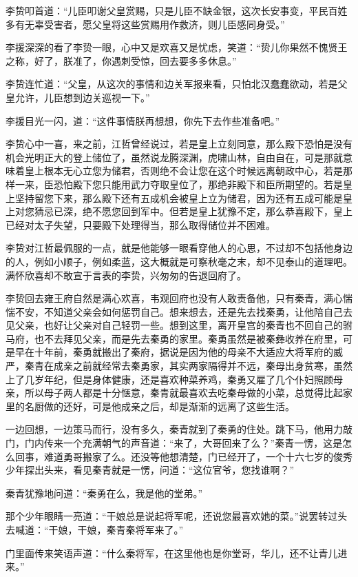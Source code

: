 李贽叩首道：“儿臣叩谢父皇赏赐，只是儿臣不缺金银，这次长安事变，平民百姓多有无辜受害者，愿父皇将这些赏赐用作救济，则儿臣感同身受。”

李援深深的看了李贽一眼，心中又是欢喜又是忧虑，笑道：“贽儿你果然不愧贤王之称，好了，朕准了，你遇刺受惊，回去要多多休息。”

李贽连忙道：“父皇，从这次的事情和边关军报来看，只怕北汉蠢蠢欲动，若是父皇允许，儿臣想到边关巡视一下。”

李援目光一闪，道：“这件事情朕再想想，你先下去作些准备吧。”

李贽心中一喜，来之前，江哲曾经说过，若是皇上立刻同意，那么殿下恐怕是没有机会光明正大的登上储位了，虽然说龙腾深渊，虎啸山林，自由自在，可是那就意味着皇上根本无心立您为储君，否则绝不会让您在这个时候远离朝政中心，若是那样一来，臣恐怕殿下您只能用武力夺取皇位了，那绝非殿下和臣所期望的。若是皇上坚持留您下来，那么殿下还有五成机会被皇上立为储君，因为还有五成可能是皇上对您猜忌已深，绝不愿您回到军中。但若是皇上犹豫不定，那么恭喜殿下，皇上已经对太子失望，只要殿下处理得当，那么取得储位并不困难。

李贽对江哲最佩服的一点，就是他能够一眼看穿他人的心思，不过却不包括他身边的人，例如小顺子，例如柔蓝，这大概就是可察秋毫之末，却不见泰山的道理吧。满怀欣喜却不敢宣于言表的李贽，兴匆匆的告退回府了。

李贽回去雍王府自然是满心欢喜，韦观回府也没有人敢责备他，只有秦青，满心惴惴不安，不知道父亲会如何惩罚自己。想来想去，还是先去找秦勇，让他陪自己去见父亲，也好让父亲对自己轻罚一些。想到这里，离开皇宫的秦青也不回自己的驸马府，也不去拜见父亲，而是先去秦勇的家里。秦勇虽然是被秦彝收养在府里，可是早在十年前，秦勇就搬出了秦府，据说是因为他的母亲不大适应大将军府的威严，秦青在成亲之前就经常去秦勇家，其实两家隔得并不远，秦母出身贫寒，虽然上了几岁年纪，但是身体健康，还是喜欢种菜养鸡，秦勇又雇了几个仆妇照顾母亲，所以母子两人都是十分惬意，秦青就最喜欢去吃秦母做的小菜，总觉得比起家里的名厨做的还好，可是他成亲之后，却是渐渐的远离了这些生活。

一边回想，一边策马而行，没有多久，秦青就到了秦勇的住处。跳下马，他用力敲门，门内传来一个充满朝气的声音道：“来了，大哥回来了么？”秦青一愣，这是怎么回事，难道勇哥搬家了么。还没等他想清楚，门已经开了，一个十六七岁的俊秀少年探出头来，看见秦青就是一愣，问道：“这位官爷，您找谁啊？”

秦青犹豫地问道：“秦勇在么，我是他的堂弟。”

那个少年眼睛一亮道：“干娘总是说起将军呢，还说您最喜欢她的菜。”说罢转过头去喊道：“干娘，干娘，秦青秦将军来了。”

门里面传来笑语声道：“什么秦将军，在这里他也是你堂哥，华儿，还不让青儿进来。”

